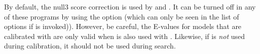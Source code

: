 %

By default, the null3 score correction is used by  and . It can be turned off in any of these
programs by using the  option (which can only be seen
in the list of options if  is invoked)). However, be careful,
the E-values for models that are calibrated with  are
only valid when  is also used with
. Likewise, if  is \emph{not} used
during calibration, it should not be used during search.


